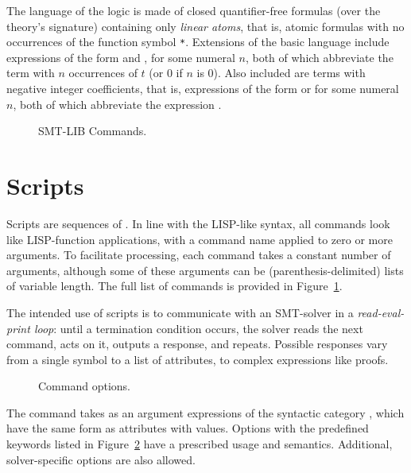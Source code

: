 The language of the logic is made of
closed quantifier-free formulas (over the theory's signature)
containing only \emph{linear atoms}, that is, 
atomic formulas with no occurrences of the function symbol \verb|*|.
Extensions of the basic language include 
expressions of the form  and , 
for some numeral $n$, 
both of which abbreviate the term  
with $n$ occurrences of $t$ (or 0 if $n$ is 0).
Also included are terms with negative integer coefficients, that is,
expressions of the form  or  
for some numeral $n$,
both of which abbreviate the expression .



\begin{figure}%
\small
\cCommands
\caption{SMT-LIB Commands.}
\label{fig:commands}
\end{figure}


\section{Scripts}  \label{sec:scripts}

Scripts are sequences of .  
In line with the LISP-like syntax, all commands look like 
LISP-function applications, with a command name applied to zero or more arguments.
To facilitate processing, each command takes a constant number of arguments,
although some of these arguments can be (parenthesis-delimited) lists 
of variable length.
The full list of commands is provided in Figure~\ref{fig:commands}.

The intended use of scripts is to communicate with an SMT-solver 
in a \emph{read-eval-print loop}: until a termination condition occurs, 
the solver reads the next command, acts on it, outputs a response, and repeats.
Possible responses vary from a single symbol to a list of attributes, 
to complex expressions like proofs.


\begin{figure}
\small
\cCommandOptions
\caption{Command options.}
\label{fig:command-options}
\end{figure}

The command  takes as an argument expressions 
of the syntactic category , which have the same form 
as attributes with values.
Options with the predefined keywords listed in Figure~\ref{fig:command-options} 
have a prescribed usage and semantics.
Additional, solver-specific options are also allowed.


